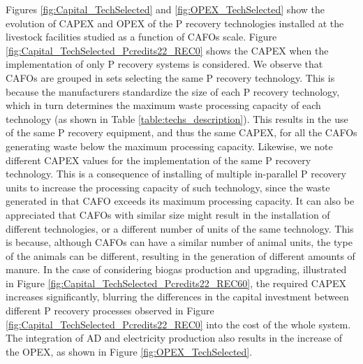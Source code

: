 \documentclass[authoryear]{elsarticle}
\begin{document}
Figures \ref{fig:Capital_TechSelected} and \ref{fig:OPEX_TechSelected} show the evolution of CAPEX and OPEX of the P recovery technologies installed at the livestock facilities studied as a function of CAFOs scale. Figure \ref{fig:Capital_TechSelected_Pcredits22_REC0} shows the CAPEX when the implementation of only P recovery systems is considered. We observe that CAFOs are grouped in sets selecting the same P recovery technology. This is because the manufacturers standardize the size of each P recovery technology, which in turn determines the maximum waste processing capacity of each technology (as shown in Table \ref{table:techs_description}). This results in the use of the same P recovery equipment, and thus the same CAPEX, for all the CAFOs generating waste below the maximum processing capacity.
Likewise, we note different CAPEX values for the implementation of the same P recovery technology. This is a consequence of installing of multiple in-parallel P recovery units to increase the processing capacity of such technology, since the waste generated in that CAFO exceeds its maximum processing capacity.
It can also be appreciated that CAFOs with similar size might result in the installation of different technologies, or a different number of units of the same technology.
This is because, although CAFOs can have a similar number of animal units, the type of the animals can be different, resulting in the generation of different amounts of manure. 
In the case of considering biogas production and upgrading, illustrated in Figure \ref{fig:Capital_TechSelected_Pcredits22_REC60}, the required CAPEX increases significantly, blurring the differences in the capital investment between different P recovery processes observed in Figure \ref{fig:Capital_TechSelected_Pcredits22_REC0} into the cost of the whole system. The integration of AD and electricity production also results in the increase of the OPEX, as shown in Figure \ref{fig:OPEX_TechSelected}.
\end{document}
